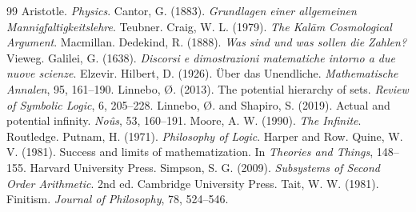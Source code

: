\documentclass{situationist-preprint}
\begin{document}
\begin{thebibliography}{99}\small
{} Aristotle. \emph{Physics}.
 Cantor, G. (1883). \emph{Grundlagen einer allgemeinen Mannigfaltigkeitslehre}. Teubner.
 Craig, W. L. (1979). \emph{The Kal\=am Cosmological Argument}. Macmillan.
 Dedekind, R. (1888). \emph{Was sind und was sollen die Zahlen?} Vieweg.
 Galilei, G. (1638). \emph{Discorsi e dimostrazioni matematiche intorno a due nuove scienze}. Elzevir.
 Hilbert, D. (1926). Über das Unendliche. \emph{Mathematische Annalen}, 95, 161--190.
 Linnebo, Ø. (2013). The potential hierarchy of sets. \emph{Review of Symbolic Logic}, 6, 205--228.
 Linnebo, Ø. and Shapiro, S. (2019). Actual and potential infinity. \emph{Noûs}, 53, 160--191.
 Moore, A. W. (1990). \emph{The Infinite}. Routledge.
 Putnam, H. (1971). \emph{Philosophy of Logic}. Harper and Row.
 Quine, W. V. (1981). Success and limits of mathematization. In \emph{Theories and Things}, 148--155. Harvard University Press.
 Simpson, S. G. (2009). \emph{Subsystems of Second Order Arithmetic}. 2nd ed. Cambridge University Press.
 Tait, W. W. (1981). Finitism. \emph{Journal of Philosophy}, 78, 524--546.
\end{thebibliography}
\end{document}
